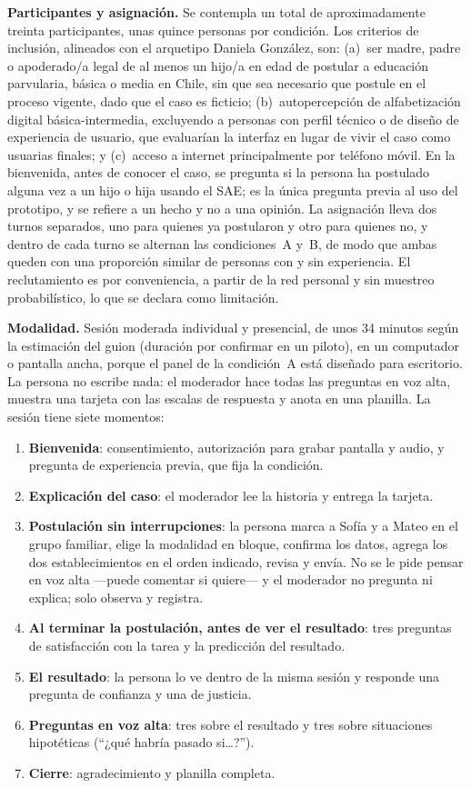 \textbf{Participantes y asignación.} Se contempla un total de aproximadamente treinta participantes, unas quince personas por condición. Los criterios de inclusión, alineados con el arquetipo Daniela González, son: (a)~ser madre, padre o apoderado/a legal de al menos un hijo/a en edad de postular a educación parvularia, básica o media en Chile, sin que sea necesario que postule en el proceso vigente, dado que el caso es ficticio; (b)~autopercepción de alfabetización digital básica-intermedia, excluyendo a personas con perfil técnico o de diseño de experiencia de usuario, que evaluarían la interfaz en lugar de vivir el caso como usuarias finales; y (c)~acceso a internet principalmente por teléfono móvil. En la bienvenida, antes de conocer el caso, se pregunta si la persona ha postulado alguna vez a un hijo o hija usando el SAE; es la única pregunta previa al uso del prototipo, y se refiere a un hecho y no a una opinión. La asignación lleva dos turnos separados, uno para quienes ya postularon y otro para quienes no, y dentro de cada turno se alternan las condiciones~A y~B, de modo que ambas queden con una proporción similar de personas con y sin experiencia. El reclutamiento es por conveniencia, a partir de la red personal y sin muestreo probabilístico, lo que se declara como limitación.

\textbf{Modalidad.} Sesión moderada individual y presencial, de unos 34 minutos según la estimación del guion (duración por confirmar en un piloto), en un computador o pantalla ancha, porque el panel de la condición~A está diseñado para escritorio. La persona no escribe nada: el moderador hace todas las preguntas en voz alta, muestra una tarjeta con las escalas de respuesta y anota en una planilla. La sesión tiene siete momentos:
\begin{enumerate}
    \item \textbf{Bienvenida}: consentimiento, autorización para grabar pantalla y audio, y pregunta de experiencia previa, que fija la condición.
    \item \textbf{Explicación del caso}: el moderador lee la historia y entrega la tarjeta.
    \item \textbf{Postulación sin interrupciones}: la persona marca a Sofía y a Mateo en el grupo familiar, elige la modalidad en bloque, confirma los datos, agrega los dos establecimientos en el orden indicado, revisa y envía. No se le pide pensar en voz alta ---puede comentar si quiere--- y el moderador no pregunta ni explica; solo observa y registra.
    \item \textbf{Al terminar la postulación, antes de ver el resultado}: tres preguntas de satisfacción con la tarea y la predicción del resultado.
    \item \textbf{El resultado}: la persona lo ve dentro de la misma sesión y responde una pregunta de confianza y una de justicia.
    \item \textbf{Preguntas en voz alta}: tres sobre el resultado y tres sobre situaciones hipotéticas (``¿qué habría pasado si\ldots?'').
    \item \textbf{Cierre}: agradecimiento y planilla completa.
\end{enumerate}

